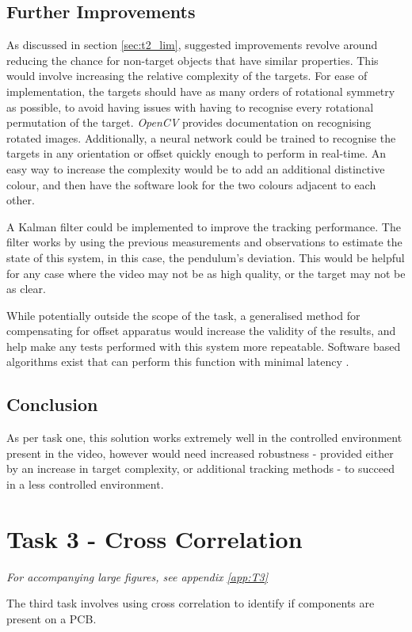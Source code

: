 \documentclass[conference]{IEEEtran}
\begin{document}
\subsection{Further Improvements}
As discussed in section \ref{sec:t2_lim}, suggested improvements revolve around reducing the chance for non-target objects that have similar properties. This would involve increasing the relative complexity of the targets. For ease of implementation, the targets should have as many orders of rotational symmetry as possible, to avoid having issues with having to recognise every rotational permutation of the target. \textit{OpenCV} provides documentation on recognising rotated images\cite{OpenCV_Rotate}. Additionally, a neural network could be trained to recognise the targets in any orientation or offset quickly enough to perform in real-time\cite{google}. An easy way to increase the complexity would be to add an additional distinctive colour, and then have the software look for the two colours adjacent to each other.

A Kalman filter could be implemented to improve the tracking performance\cite{Kalman}. The filter works by using the previous measurements and observations to estimate the state of this system, in this case, the pendulum's deviation. This would be helpful for any case where the video may not be as high quality, or the target may not be as clear.

While potentially outside the scope of the task, a generalised method for compensating for offset apparatus would increase the validity of the results, and help make any tests performed with this system more repeatable. Software based algorithms exist that can perform this function with minimal latency \cite{5138693}. 
\subsection{Conclusion}
As per task one, this solution works extremely well in the controlled environment present in the video, however would need increased robustness - provided either by an increase in target complexity, or additional tracking methods - to succeed in a less controlled environment.
\section{Task 3 - Cross Correlation}
\textit{For accompanying large figures, see appendix \ref{app:T3}}

The third task involves using cross correlation to identify if components are present on a PCB.
\end{document}
